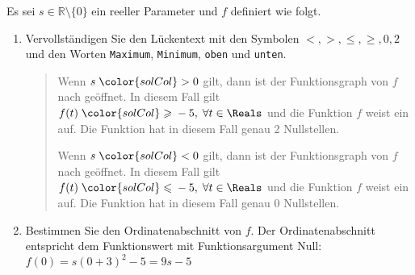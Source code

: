 \documentclass[12pt]{article}
\begin{document}
Es sei $s \in \mathbb{R} \setminus \{0\}$ ein reeller Parameter und $f$ definiert wie folgt. 
\begin{enumerate}[label=\alph*)]
\item Vervollständigen Sie den Lückentext mit den Symbolen $<,>, \leqslant, \geqslant,0,2$ und den Worten \texttt{Maximum}, \texttt{Minimum}, \texttt{oben} und \texttt{unten}.
\begin{quote}
Wenn $s \; {\color{solCol}>} \; 0$ gilt, dann ist der Funktionsgraph von $f$ nach {} geöffnet. In diesem Fall gilt $f(t)\; {\color{solCol}\geqslant} \; -5, \; \forall t \in \Reals$ und die Funktion $f$ weist ein {} auf. Die Funktion hat in diesem Fall genau {\color{solCol}2} Nullstellen.


Wenn $s \;{\color{solCol}<} \; 0$ gilt, dann ist der Funktionsgraph von $f$ nach {} geöffnet. In diesem Fall gilt $f(t)\; {\color{solCol}\leqslant} \; -5, \; \forall t \in \Reals$ und die Funktion $f$ weist ein {} auf. Die Funktion hat in diesem Fall genau {\color{solCol}0} Nullstellen.
\end{quote}
\item Bestimmen Sie den Ordinatenabschnitt von $f$. {\color{solCol}Der Ordinatenabschnitt entspricht dem Funktionswert mit Funktionsargument Null: $f(0) = s(0+3)^2 - 5 = 9s-5$}
\end{enumerate}


\end{document}
